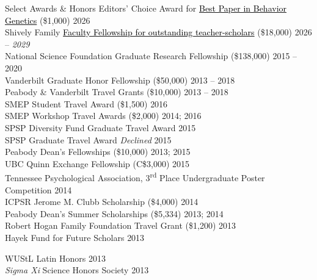 \begin{rSection}{\textrm{Select Awards \& Honors}}
Editors' Choice Award for \href{https://link.springer.com/article/10.1007/s10519-025-10225-1}{\textcolor{black}{Best Paper in Behavior Genetics}} (\$1,000) \hfill{2026}\\ 
Shively Family \href{https://college.wfu.edu/faculty-resources/fellowships/}{\textcolor{black}{Faculty Fellowship for outstanding teacher-scholars}} (\$18,000) 	\hfill{2026 – \textit{2029}}\\ 
National Science Foundation Graduate Research Fellowship (\$138,000) 	\hfill{2015 – 2020}\\
Vanderbilt Graduate Honor Fellowship (\$50,000)				\hfill{2013 – 2018}\\	
Peabody \& Vanderbilt Travel Grants (\$10,000)				\hfill  {2013 – 2018}\\
SMEP Student Travel Award (\$1,500)						\hfill{2016}\\
SMEP Workshop Travel Awards (\$2,000)					\hfill{2014; 2016}\\
SPSP Diversity Fund Graduate Travel Award %
\hfill{2015}\\
SPSP Graduate Travel Award %
{\small \textit{Declined}} \hfill{2015}\\
Peabody Dean's Fellowships (\$10,000)					\hfill  {2013; 2015}\\
UBC Quinn Exchange Fellowship (C\$3,000) \hfill{2015}\\
Tennessee Psychological Association, 3\textsuperscript{rd} Place Undergraduate Poster Competition \hfill{2014}\\
ICPSR Jerome M. Clubb Scholarship (\$4,000) \hfill{2014}\\
Peabody Dean's Summer Scholarships (\$5,334)			    \hfill  {2013; 2014}\\	
Robert Hogan Family Foundation Travel Grant (\$1,200) 	\hfill  {2013}\\
Hayek Fund for Future Scholars                      \hfill{2013}\\
\begin{minipage}{\linewidth}
\vspace{1.1mm} WUStL Latin Honors \hfill{2013}\\
\textit{Sigma Xi} Science Honors Society   	\hfill  {2013}
\end{minipage}%
\vspace{-1ex}
\end{rSection}

